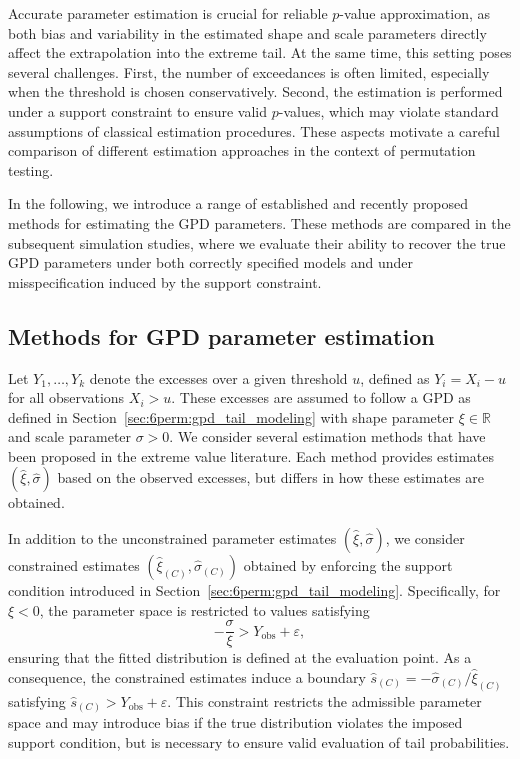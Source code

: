 Accurate parameter estimation is crucial for reliable $p$-value approximation, as both bias and variability in the estimated shape and scale parameters directly affect the extrapolation into the extreme tail. At the same time, this setting poses several challenges. 
First, the number of exceedances is often limited, especially when the threshold is chosen conservatively. Second, the estimation is performed under a support constraint to ensure valid $p$-values, which may violate standard assumptions of classical estimation procedures. 
These aspects motivate a careful comparison of different estimation approaches in the context of permutation testing.

In the following, we introduce a range of established and recently proposed methods for estimating the GPD parameters. These methods are compared in the subsequent simulation studies, where we evaluate their ability to recover the true GPD parameters under both correctly specified models and under misspecification induced by the support constraint.

\subsection{Methods for GPD parameter estimation}
\label{sec:6perm:param_est:methods}

Let $Y_1, \dots, Y_k$ denote the excesses over a given threshold $u$, defined as $Y_i = X_i - u$ for all observations $X_i > u$. 
These excesses are assumed to follow a GPD as defined in Section~\ref{sec:6perm:gpd_tail_modeling} with shape parameter $\xi \in \mathbb{R}$ and scale parameter $\sigma > 0$. We consider several estimation methods that have been proposed in the extreme value literature. Each method provides estimates $(\hat{\xi}, \hat{\sigma})$ based on the observed excesses, but differs in how these estimates are obtained.

In addition to the unconstrained parameter estimates $(\hat{\xi}, \hat{\sigma})$, we consider constrained estimates $(\hat{\xi}_{(C)}, \hat{\sigma}_{(C)})$ obtained by enforcing the support condition introduced in Section~\ref{sec:6perm:gpd_tail_modeling}. 
Specifically, for $\xi < 0$, the parameter space is restricted to values satisfying
\begin{equation}
-\frac{\sigma}{\xi} > Y_{\mathrm{obs}} + \varepsilon,
\end{equation}
ensuring that the fitted distribution is defined at the evaluation point. 
As a consequence, the constrained estimates induce a boundary $\hat{s}_{(C)}=-\hat{\sigma}_{(C)}/\hat{\xi}_{(C)}$ satisfying $\hat{s}_{(C)} > Y_{\mathrm{obs}} + \varepsilon$.
This constraint restricts the admissible parameter space and may introduce bias if the true distribution violates the imposed support condition, but is necessary to ensure valid evaluation of tail probabilities.

